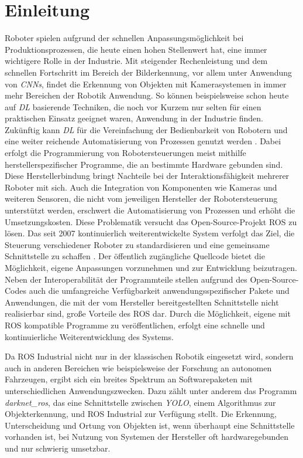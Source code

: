 \chapter{Einleitung}

Roboter spielen aufgrund der schnellen Anpassungsmöglichkeit bei Produktionsprozessen, die heute einen hohen Stellenwert hat, eine immer wichtigere Rolle in der Industrie. Mit steigender Rechenleistung und dem schnellen Fortschritt im Bereich der Bilderkennung, vor allem unter Anwendung von \textit{\acp{CNN}}, findet die Erkennung von Objekten mit Kamerasystemen in immer mehr Bereichen der Robotik Anwendung. So können beispielsweise schon heute auf \textit{\ac{DL}} basierende Techniken, die noch vor Kurzem nur selten für einen praktischen Einsatz geeignet waren, Anwendung in der Industrie finden. Zukünftig kann \textit{\ac{DL}} für die Vereinfachung der Bedienbarkeit von Robotern und eine weiter reichende Automatisierung von Prozessen genutzt werden \cite{diesing_how_2021}. Dabei erfolgt die Programmierung von Robotersteuerungen meist mithilfe herstellerspezifischer Programme, die an bestimmte Hardware gebunden sind. Diese Herstellerbindung bringt Nachteile bei der Interaktionsfähigkeit mehrerer Roboter mit sich. Auch die Integration von Komponenten wie Kameras und weiteren Sensoren, die nicht vom jeweiligen Hersteller der Robotersteuerung unterstützt werden, erschwert die Automatisierung von Prozessen und erhöht die Umsetzungskosten. Diese Problematik versucht das Open-Source-Projekt \ac{ROS} zu lösen. Das seit 2007 kontinuierlich weiterentwickelte System verfolgt das Ziel, die Steuerung verschiedener Roboter zu standardisieren und eine gemeinsame Schnittstelle zu schaffen \cite[Kapitel~1]{quigley_ros_2009}. Der öffentlich zugängliche Quellcode bietet die Möglichkeit, eigene Anpassungen vorzunehmen und zur Entwicklung beizutragen. Neben der Interoperabilität der Programmteile stellen aufgrund des Open-Source-Codes auch die umfangreiche Verfügbarkeit anwendungsspezifischer Pakete und Anwendungen, die mit der vom Hersteller bereitgestellten Schnittstelle nicht realisierbar sind, große Vorteile des \ac{ROS} dar. Durch die Möglichkeit, eigene mit \ac{ROS} kompatible Programme zu veröffentlichen, erfolgt eine schnelle und kontinuierliche Weiterentwicklung des Systems.

Da \ac {ROS} Industrial nicht nur in der klassischen Robotik eingesetzt wird, sondern auch in anderen Bereichen wie beispielsweise der Forschung an autonomen Fahrzeugen, ergibt sich ein breites Spektrum an Softwarepaketen mit unterschiedlichen Anwendungszwecken. Dazu zählt unter anderem das Programm \textit{darknet\_ros}, das eine Schnittstelle zwischen \textit{\ac{YOLO}}, einem Algorithmus zur Objekterkennung, und \ac{ROS} Industrial zur Verfügung stellt. Die Erkennung, Unterscheidung und Ortung von Objekten ist, wenn überhaupt eine Schnittstelle vorhanden ist, bei Nutzung von Systemen der Hersteller oft hardwaregebunden und nur schwierig umsetzbar. 

